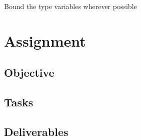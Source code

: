 \documentclass[a4paper, 11pt]{article}
\newcommand{\TODO}[1]{#1}
\begin{document}
\TODO{Bound the type variables wherever possible}

\section{Assignment}
\subsection{Objective}

\subsection{Tasks}


\subsection{Deliverables}



\end{document}
